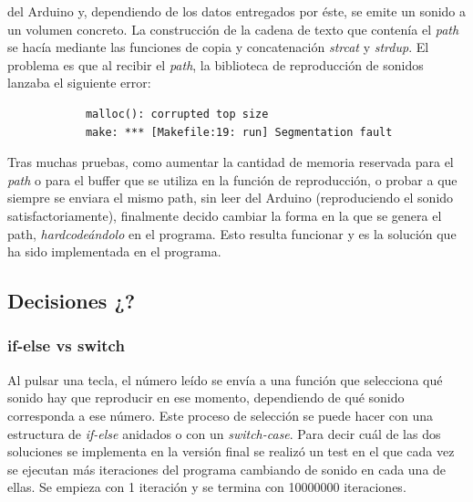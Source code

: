 \documentclass{article}
\begin{document}
\begin{itemize}
            del Arduino y, dependiendo de los datos entregados por éste, se emite un sonido a un volumen concreto.
            La construcción de la cadena de texto que contenía el \textit{path} se hacía mediante las funciones de
            copia y concatenación \textit{strcat} y \textit{strdup}. El problema es que al recibir el \textit{path},
            la biblioteca de reproducción de sonidos lanzaba el siguiente error:
            \begin{verbatim}
            malloc(): corrupted top size
            make: *** [Makefile:19: run] Segmentation fault
            \end{verbatim}
            Tras muchas pruebas, como aumentar la cantidad de memoria reservada para el \textit{path} o para el
            buffer que se utiliza en la función de reproducción, o probar a que siempre se enviara el mismo path,
            sin leer del Arduino (reproduciendo el sonido satisfactoriamente), finalmente decido cambiar la forma en
            la que se genera el path, \textit{hardcodeándolo} en el programa. Esto resulta funcionar y es la solución
            que ha sido implementada en el programa.
        \end{itemize}


    \subsection{Decisiones ¿?} %
    \label{sub:Decisiones}

        \subsubsection{if-else vs switch} %
        \label{ssub:if-else_vs_switch}

            Al pulsar una tecla, el número leído se envía a una función que selecciona qué sonido hay que reproducir en
            ese momento, dependiendo de qué sonido corresponda a ese número. Este proceso de selección se puede hacer
            con una estructura de \textit{if-else} anidados o con un \textit{switch-case}.\newline
            Para decir cuál de las dos soluciones se implementa en la versión final se realizó un test en el que cada
            vez se ejecutan más iteraciones del programa cambiando de sonido en cada una de ellas. Se empieza con 1
            iteración y se termina con 10000000 iteraciones.\newline
\end{document}
